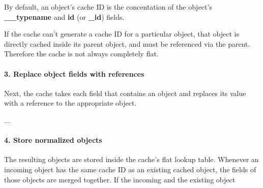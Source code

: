 By default, an object's cache ID is the concentation of the object's \textbf{\_\_typename} and \textbf{id} (or \textbf{\_id}) fields.

If the cache can't generate a cache ID for a particular object, that object is directly cached inside its parent object, and must be referenced via the parent. Therefore the cache is not always completely flat.

\paragraph{3. Replace object fields with references} 

Next, the cache takes each field that contains an object and replaces its value with a reference to the appropriate object.

...

\paragraph{4. Store normalized objects} 

The resulting objects are stored inside the cache's flat lookup table. Whenever an incoming object has the same cache ID as an existing cached object, the fields of those objects are merged together. If the incoming and the existing object


